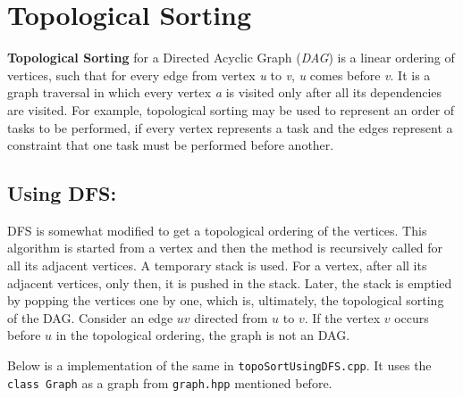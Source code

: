 \documentclass[
]{article}
\author{}
\date{}
\begin{document}
\hypertarget{topological-sorting}{%
\section{Topological Sorting}\label{topological-sorting}}

\textbf{Topological Sorting} for a Directed Acyclic Graph (\emph{DAG})
is a linear ordering of vertices, such that for every edge from vertex
\emph{u} to \emph{v}, \emph{u} comes before \emph{v}. It is a graph
traversal in which every vertex \emph{a} is visited only after all its
dependencies are visited. For example, topological sorting may be used
to represent an order of tasks to be performed, if every vertex
represents a task and the edges represent a constraint that one task
must be performed before another.

\hypertarget{using-dfs}{%
\subsection{Using DFS:}\label{using-dfs}}

DFS is somewhat modified to get a topological ordering of the vertices.
This algorithm is started from a vertex and then the method is
recursively called for all its adjacent vertices. A temporary stack is
used. For a vertex, after all its adjacent vertices, only then, it is
pushed in the stack. Later, the stack is emptied by popping the vertices
one by one, which is, ultimately, the topological sorting of the DAG.
Consider an edge \(uv\) directed from \(u\) to \(v\). If the vertex
\(v\) occurs before \(u\) in the topological ordering, the graph is not
an DAG.

Below is a implementation of the same in \texttt{topoSortUsingDFS.cpp}.
It uses the \texttt{class\ Graph} as a graph from \texttt{graph.hpp}
mentioned before.
\end{document}
